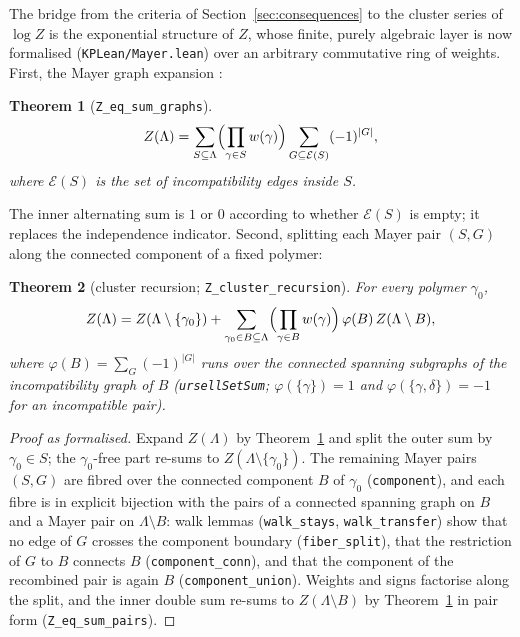 \documentclass[11pt]{amsart}
\newtheorem{theorem}{Theorem}[section]
\begin{document}
The bridge from the criteria of Section~\ref{sec:consequences} to the
cluster series of $\log Z$ is the exponential structure of $Z$, whose
finite, purely algebraic layer is now formalised
(\texttt{KPLean/Mayer.lean}) over an arbitrary commutative ring of
weights. First, the Mayer graph expansion \cite{MM41}:

\begin{theorem}[\texttt{Z\_eq\_sum\_graphs}]\label{thm:mayer}
\[
  Z(\Lambda) = \sum_{S \subseteq \Lambda}
  \Bigl(\prod_{\gamma \in S} w(\gamma)\Bigr)
  \sum_{G \subseteq \mathcal{E}(S)} (-1)^{\lvert G \rvert},
\]
where $\mathcal{E}(S)$ is the set of incompatibility edges inside $S$.
\end{theorem}

The inner alternating sum is $1$ or $0$ according to whether
$\mathcal{E}(S)$ is empty; it replaces the independence indicator.
Second, splitting each Mayer pair $(S, G)$ along the connected
component of a fixed polymer:

\begin{theorem}[cluster recursion; \texttt{Z\_cluster\_recursion}]
\label{thm:cluster}
For every polymer $\gamma_0$,
\[
  Z(\Lambda) = Z(\Lambda \setminus \{\gamma_0\})
  + \sum_{\gamma_0 \in B \subseteq \Lambda}
    \Bigl(\prod_{\gamma \in B} w(\gamma)\Bigr)\, \varphi(B)\,
    Z(\Lambda \setminus B),
\]
where $\varphi(B) = \sum_{G} (-1)^{\lvert G \rvert}$ runs over the
connected spanning subgraphs of the incompatibility graph of $B$
(\texttt{ursellSetSum}; $\varphi(\{\gamma\}) = 1$ and
$\varphi(\{\gamma, \delta\}) = -1$ for an incompatible pair).
\end{theorem}

\begin{proof}[Proof as formalised]
Expand $Z(\Lambda)$ by Theorem~\ref{thm:mayer} and split the outer sum
by $\gamma_0 \in S$; the $\gamma_0$-free part re-sums to
$Z(\Lambda \setminus \{\gamma_0\})$. The remaining Mayer pairs $(S, G)$
are fibred over the connected component $B$ of $\gamma_0$
(\texttt{component}), and each fibre is in explicit bijection with the
pairs of a connected spanning graph on $B$ and a Mayer pair on
$\Lambda \setminus B$: walk lemmas (\texttt{walk\_stays},
\texttt{walk\_transfer}) show that no edge of $G$ crosses the component
boundary (\texttt{fiber\_split}), that the restriction of $G$ to $B$
connects $B$ (\texttt{component\_conn}), and that the component of the
recombined pair is again $B$ (\texttt{component\_union}). Weights and
signs factorise along the split, and the inner double sum re-sums to
$Z(\Lambda \setminus B)$ by Theorem~\ref{thm:mayer} in pair form
(\texttt{Z\_eq\_sum\_pairs}).
\end{proof}
\end{document}
